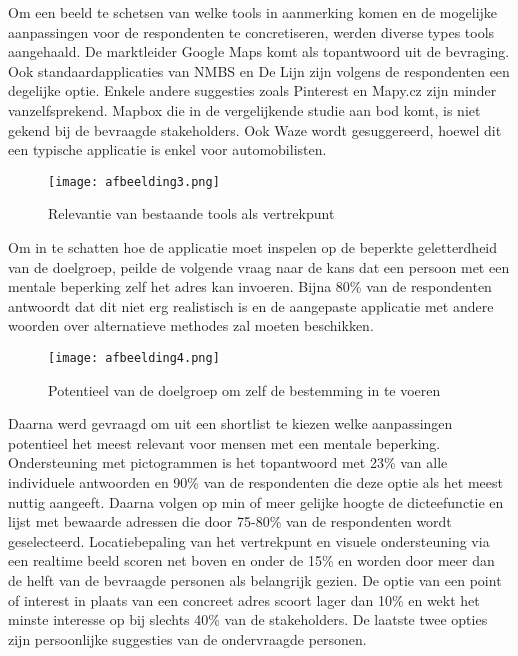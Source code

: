 Om een beeld te schetsen van welke tools in aanmerking komen en de mogelijke aanpassingen voor de respondenten te concretiseren, werden diverse types tools aangehaald. De marktleider Google Maps komt als topantwoord uit de bevraging. Ook standaardapplicaties van NMBS en De Lijn zijn volgens de respondenten een degelijke optie. Enkele andere suggesties zoals Pinterest en Mapy.cz zijn minder vanzelfsprekend. Mapbox die in de vergelijkende studie aan bod komt, is niet gekend bij de bevraagde stakeholders. Ook Waze wordt gesuggereerd, hoewel dit een typische applicatie is enkel voor automobilisten.

\begin{figure}[h]
    \centering
    \texttt{[image: afbeelding3.png]}
    \caption{Relevantie van bestaande tools als vertrekpunt}
    \label{fig:relevantie}
\end{figure}

Om in te schatten hoe de applicatie moet inspelen op de beperkte geletterdheid van de doelgroep, peilde de volgende vraag naar de kans dat een persoon met een mentale beperking zelf het adres kan invoeren. Bijna 80\% van de respondenten antwoordt dat dit niet erg realistisch is en de aangepaste applicatie met andere woorden over alternatieve methodes zal moeten beschikken.

\begin{figure}[h]
    \centering
    \texttt{[image: afbeelding4.png]}
    \caption{Potentieel van de doelgroep om zelf de bestemming in te voeren}
    \label{fig:potentieeldoelgroep}
\end{figure}

Daarna werd gevraagd om uit een shortlist te kiezen welke aanpassingen potentieel het meest relevant voor mensen met een mentale beperking. Ondersteuning met pictogrammen is het topantwoord met 23\% van alle individuele antwoorden en 90\% van de respondenten die deze optie als het meest nuttig aangeeft. Daarna volgen op min of meer gelijke hoogte de dicteefunctie en lijst met bewaarde adressen die door 75-80\% van de respondenten wordt geselecteerd. Locatiebepaling van het vertrekpunt en visuele ondersteuning via een realtime beeld scoren net boven en onder de 15\% en worden door meer dan de helft van de bevraagde personen als belangrijk gezien. De optie van een point of interest in plaats van een concreet adres scoort lager dan 10\% en wekt het minste interesse op bij slechts 40\% van de stakeholders. De laatste twee opties zijn persoonlijke suggesties van de ondervraagde personen.

